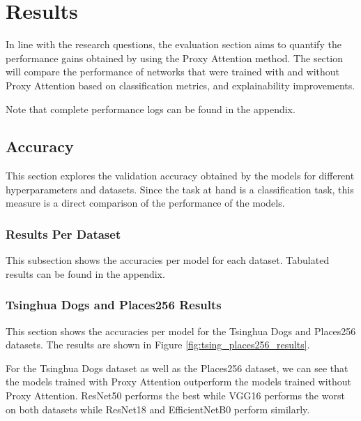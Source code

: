 \chapter{Results} \label{ch:results}
In line with the research questions, the evaluation section aims to quantify the performance gains obtained by using the Proxy Attention method. The section will compare the performance of networks that were trained with and without Proxy Attention based on classification metrics, and explainability improvements.

Note that complete performance logs can be found in the appendix.
\section{Accuracy}
This section explores the validation accuracy obtained by the models for different hyperparameters and datasets. Since the task at hand is a classification task, this measure is a direct comparison of the performance of the models.

\subsection{Results Per Dataset}
This subsection shows the accuracies per model for each dataset. Tabulated results can be found in the appendix.

\subsection{Tsinghua Dogs and Places256 Results}
This section shows the accuracies per model for the Tsinghua Dogs \cite{zouNewDatasetDog2020} and Places256 \cite{zhouPlaces10Million2018} datasets. The results are shown in Figure \ref{fig:tsing_places256_results}.

For the Tsinghua Dogs dataset as well as the Places256 dataset, we can see that the models trained with Proxy Attention outperform the models trained without Proxy Attention. 
ResNet50 performs the best while VGG16 performs the worst on both datasets while ResNet18 and EfficientNetB0 perform similarly. 

